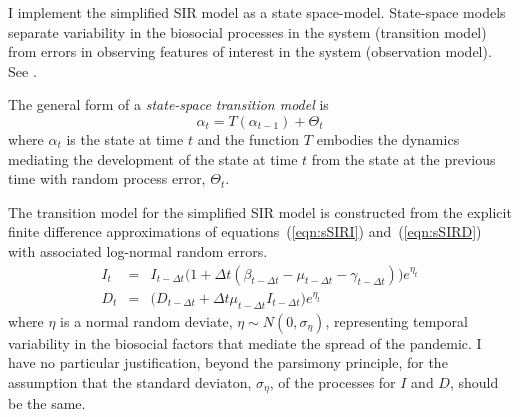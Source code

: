 \documentclass[12pt,letterpaper]{article}
\begin{document}
I implement the simplified SIR model as a state space-model.
State-space models separate variability in the biosocial
processes in the system (transition model)
from errors in observing features of interest
in the system (observation model).
See \cite{Harvey1990}.

The general form of a {\itshape state-space transition model} is
\begin{equation}
\alpha_t=T(\alpha_{t-1}) + \Theta_t
\end{equation}
where $\alpha_t$ is the state at time $t$ and 
the function $T$ embodies the dynamics mediating the
development of the state at time $t$ from the state at the previous
time with random process error, $\Theta_t$.

The transition model for the simplified SIR model is constructed from
the explicit finite difference
approximations of equations~(\ref{eqn:sSIRI}) and~(\ref{eqn:sSIRD}) 
with associated log-normal
random errors.
\begin{eqnarray}
\label{eqn:sSIRfdI}
I_t &=& I_{t-\Delta t}\big(1+\Delta t(\beta_{t-\Delta t} - \mu_{t-\Delta t}
- \gamma_{t-\Delta t})\big)e^{\eta_t}\\
\label{eqn:sSIRfdD}
D_t &=& \big(D_{t-\Delta t} + \Delta t \mu_{t-\Delta t}I_{t-\Delta
t}\big)e^{\eta_t}
\end{eqnarray}
where $\eta$ is a normal random deviate, $\eta\sim
N(0,\sigma_\eta)$, representing temporal variability in the biosocial
factors that mediate the spread of the pandemic. 
I have no particular justification, beyond the parsimony principle,
for the assumption that the standard deviaton, $\sigma_\eta$, of the processes
for $I$ and $D$, should be the same.
\end{document}
